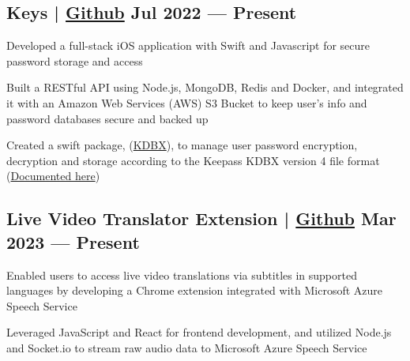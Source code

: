 
\subsection{{Keys | \href{https://github.com/jerikjakobsen/keys}{Github} \hfill Jul 2022 --- Present}}
\begin{zitemize}
\item Developed a full-stack iOS application with Swift and Javascript for secure password storage and access
\item Built a RESTful API using Node.js, MongoDB, Redis and Docker, and integrated it with an Amazon Web Services (AWS) S3 Bucket to keep user's info and password databases secure and backed up
\item Created a swift package, (\href{https://github.com/jerikjakobsen/kdbx}{KDBX}), to manage user password encryption, decryption and storage according to the Keepass KDBX version 4 file format (\href{https://keepass.info/help/kb/kdbx_4.html}{Documented here})
\end{zitemize}

\subsection{{Live Video Translator Extension | \href{https://github.com/jerikjakobsen/Translator-Extension}{Github} \hfill Mar 2023 --- Present}}
\begin{zitemize}
\item Enabled users to access live video translations via subtitles in supported languages by developing a Chrome extension integrated with Microsoft Azure Speech Service
\item Leveraged JavaScript and React for frontend development, and utilized Node.js and Socket.io to stream raw audio data to Microsoft Azure Speech Service
\end{zitemize}